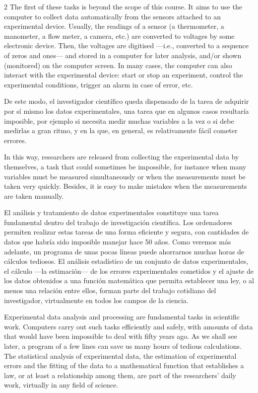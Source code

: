 \begin{paracol}{2}
\switchcolumn
The first of these tasks is beyond the scope of this course. It aims to use the computer to collect data automatically from the sensors attached to an experimental device. Usually, the readings of a sensor (a thermometer, a manometer, a flow meter, a camera, etc.) are converted to voltages by some electronic device. Then, the voltages are digitised ---i.e., converted to a sequence of zeros and ones--- and stored in a computer for later analysis, and/or shown (monitored) on the computer screen. In many cases, the computer can also interact with the experimental device: start or stop an experiment, control the experimental conditions, trigger an alarm in case of error, etc.

\switchcolumn
De este modo, el investigador científico queda dispensado de la tarea de adquirir por sí mismo los datos experimentales, una tarea que en algunos casos resultaría imposible, por ejemplo si necesita medir muchas variables a la vez o si debe medirlas a gran ritmo, y en la que, en general, es relativamente fácil cometer errores.

\switchcolumn
In this way, researchers are released from collecting the experimental data by themselves, a task that could sometimes be impossible, for instance when many variables must be measured simultaneously or when the measurements must be taken very quickly. Besides, it is easy to make mistakes when the measurements are taken manually.

\switchcolumn
El análisis y tratamiento de datos experimentales constituye una tarea fundamental dentro del trabajo de investigación científica. Los ordenadores permiten realizar estas tareas de una forma eficiente y segura, con cantidades de datos que habría sido imposible manejar hace 50 años. Como veremos más adelante, un programa de unas pocas líneas puede ahorrarnos muchas horas de cálculos tediosos. El análisis estadístico de un conjunto de datos experimentales, el cálculo ---la estimación--- de los errores experimentales cometidos y el ajuste de los datos obtenidos a una función matemática que permita establecer una ley, o al menos una relación entre ellos, forman parte del trabajo cotidiano del investigador, virtualmente en todos los campos de la ciencia.

\switchcolumn
Experimental data analysis and processing are fundamental tasks in scientific work. Computers carry out such tasks efficiently and safely, with amounts of data that would have been impossible to deal with fifty years ago. As we shall see later, a program of a few lines can save us many hours of tedious calculations. The statistical analysis of experimental data, the estimation of experimental errors and the fitting of the data to a mathematical function that establishes a law, or at least a relationship among them, are part of the researchers' daily work, virtually in any field of science.


\end{paracol}
